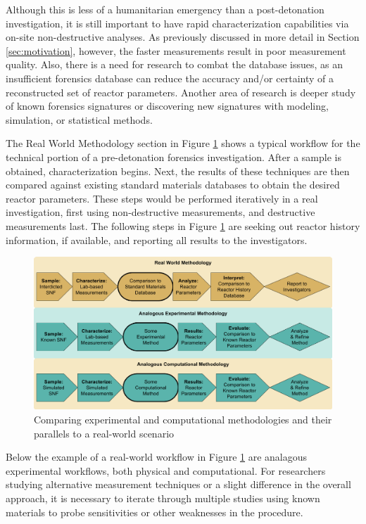 Although this is less of a humanitarian emergency than a post-detonation
investigation, it is still important to have rapid characterization
capabilities via on-site non-destructive analyses.  As previously discussed in
more detail in Section \ref{sec:motivation}, however, the faster measurements
result in poor measurement quality. Also, there is a need for research to
combat the database issues, as an insufficient forensics database can reduce
the accuracy and/or certainty of a reconstructed set of reactor parameters.
Another area of research is deeper study of known forensics signatures or
discovering new signatures with modeling, simulation, or statistical methods. 

The Real World Methodology section in Figure \ref{fig:nfworkflow} shows a
typical workflow for the technical portion of a pre-detonation forensics
investigation.  After a sample is obtained, characterization begins.  Next, the
results of these techniques are then compared against existing standard
materials databases to obtain the desired reactor parameters. These steps would
be performed iteratively in a real investigation, first using non-destructive
measurements, and destructive measurements last.  The following steps in Figure
\ref{fig:nfworkflow} are seeking out reactor history information, if available,
and reporting all results to the investigators. 
\\
\begin{figure}[!h]
  \includegraphics[width=\linewidth]{./chapters/intro/ForensicsWorkflows.png}
  \caption{Comparing experimental and computational methodologies and their parallels to a real-world scenario}
  \label{fig:nfworkflow}
\end{figure}

Below the example of a real-world workflow in Figure \ref{fig:nfworkflow} are
analagous experimental workflows, both physical and computational.  
For researchers studying
alternative measurement techniques or a slight difference in the overall
approach, it is necessary to iterate through multiple studies using known
materials to probe sensitivities or other weaknesses in the procedure.

